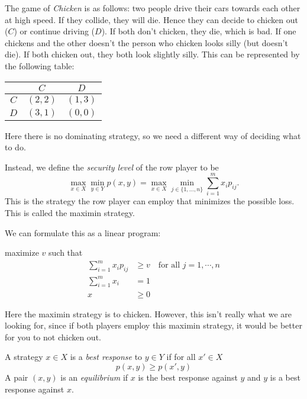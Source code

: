 \documentclass[a4paper]{article}
\begin{document}
\begin{eg}[Chicken]
  The game of \emph{Chicken} is as follows: two people drive their cars towards each other at high speed. If they collide, they will die. Hence they can decide to chicken out ($C$) or continue driving ($D$). If both don't chicken, they die, which is bad. If one chickens and the other doesn't the person who chicken looks silly (but doesn't die). If both chicken out, they both look slightly silly. This can be represented by the following table:
  \begin{center}
    \begin{tabular}{ccc}
      \toprule
      & $C$ & $D$ \\
      \midrule
      $C$ & $(2, 2)$ & $(1, 3)$ \\
      $D$ & $(3, 1)$ & $(0, 0)$\\
      \bottomrule
    \end{tabular}
  \end{center}
  Here there is no dominating strategy, so we need a different way of deciding what to do.

  Instead, we define the \emph{security level} of the row player to be
  \[
    \max_{x\in X}\min_{y\in Y} p(x, y) = \max_{x\in X}\min_{j\in \{1, \ldots, n\}} \sum_{i = 1}^m x_i p_{ij}.
  \]
  This is the strategy the row player can employ that minimizes the possible loss. This is called the maximin strategy.

  We can formulate this as a linear program:
  \begin{center}
    maximize $v$ such that
    \begin{align*}
      \sum_{i = 1}^m x_i p_{ij} &\geq v\quad\text{for all }j = 1, \cdots, n\\
      \sum_{i = 1}^m x_i &= 1\\
      x &\geq 0
    \end{align*}
  \end{center}
  Here the maximin strategy is to chicken. However, this isn't really what we are looking for, since if both players employ this maximin strategy, it would be better for you to not chicken out.
\end{eg}

\begin{defi}
  A strategy $x\in X$ is a \emph{best response} to $y\in Y$ if for all $x'\in X$
  \[
    p(x, y) \geq p(x', y)
  \]
  A pair $(x, y)$ is an \emph{equilibrium} if $x$ is the best response against $y$ and $y$ is a best response against $x$.
\end{defi}
\end{document}
